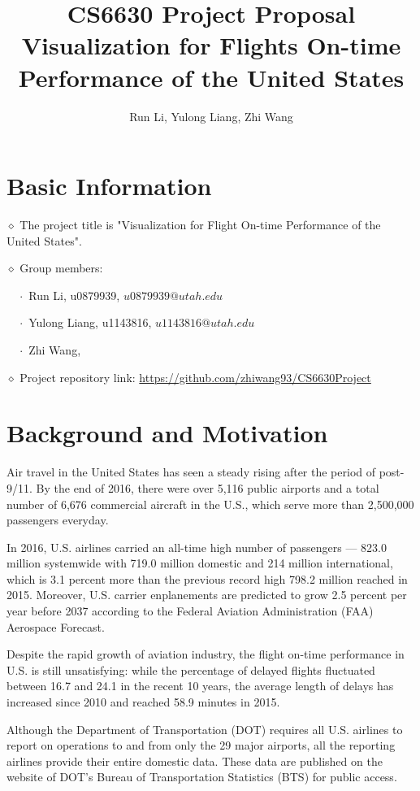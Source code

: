 \documentclass[12pt]{article}
\title{CS6630 Project Proposal\\
       Visualization for Flights On-time Performance of the United States}
\author{Run Li, Yulong Liang, Zhi Wang}
\begin{document}
\maketitle

\section{Basic Information}
    $\diamond$ The project title is "Visualization for Flight On-time Performance of the United States".

    $\diamond$ Group members:

    $\quad\cdot$ Run Li, u0879939, $u0879939@utah.edu$

    $\quad\cdot$ Yulong Liang, u1143816, $u1143816@utah.edu$

    $\quad\cdot$ Zhi Wang,

    $\diamond$ Project repository link: \url{https://github.com/zhiwang93/CS6630Project}

\section{Background and Motivation}

Air travel in the United States has seen a steady rising after the period of post-9/11. By the end of 2016, there were over 5,116 public airports and a total number of 6,676 commercial aircraft in the U.S., which serve more than 2,500,000 passengers everyday.\cite{byTheNumbers}

In 2016, U.S. airlines carried an all-time high number of passengers --- 823.0 million systemwide with 719.0 million domestic and 214 million international, which is 3.1 percent more than the previous record high 798.2 million reached in 2015.\cite{2016data} Moreover, U.S. carrier enplanements are predicted to grow 2.5 percent per year before 2037 according to the Federal Aviation Administration (FAA) Aerospace Forecast.\cite{FAA_A_F}

Despite the rapid growth of aviation industry, the flight on-time performance in U.S. is still unsatisfying: while the percentage of delayed flights fluctuated between 16.7 and 24.1 in the recent 10 years, the average length of delays has increased since 2010 and reached 58.9 minutes in 2015.\cite{PTFF2016}

Although the Department of Transportation (DOT) requires all U.S. airlines to report on operations to and from only the 29 major airports, all the reporting airlines provide their entire domestic data.\cite{airconsumer} These data are published on the website of DOT's Bureau of Transportation Statistics (BTS) for public access.
\end{document}
